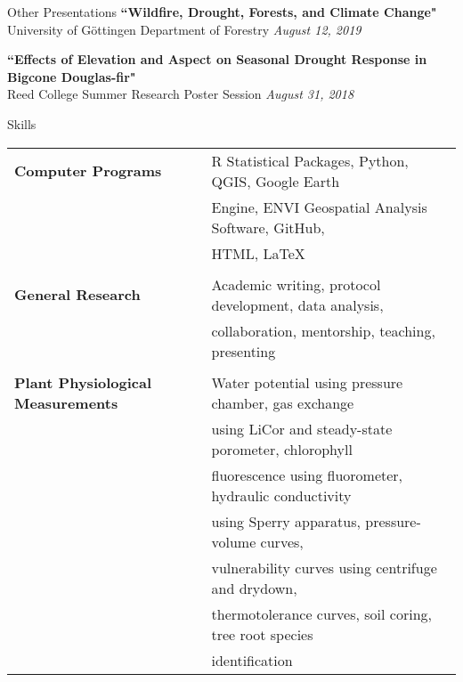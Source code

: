 \documentclass{resume} %
\begin{document}
\begin{rSection}{Other Presentations}
{\bf ``Wildfire, Drought, Forests, and Climate Change"} \\ \hspace*{0.25em}
University of G\"{o}ttingen Department of Forestry \hfill {\em August 12, 2019} 

{\bf ``Effects of Elevation and Aspect on Seasonal Drought Response in Bigcone Douglas-fir"} \\ \hspace*{0.25em}
Reed College Summer Research Poster Session \hfill {\em August 31, 2018} 
\smallskip
\end{rSection}




\begin{rSection}{Skills}

\begin{tabular}{ @{} >{\bfseries}l @{\hspace{6ex}} l }
Computer Programs & R Statistical Packages, Python, QGIS, Google Earth \\ & Engine, ENVI Geospatial Analysis Software, GitHub, \\ &  HTML, \LaTeX \\ \\
General Research & Academic writing, protocol development, data analysis, \\ & collaboration, mentorship,  teaching, presenting \\ \\ 
Plant Physiological Measurements  & Water potential using pressure chamber, gas exchange \\ & using LiCor and steady-state porometer, chlorophyll \\ & fluorescence using fluorometer, hydraulic conductivity \\ & using Sperry apparatus, pressure-volume curves, \\& vulnerability curves using centrifuge and drydown, \\ &  thermotolerance curves, soil  coring, tree root species \\ & identification 
\end{tabular}

\end{rSection}





\end{document}
